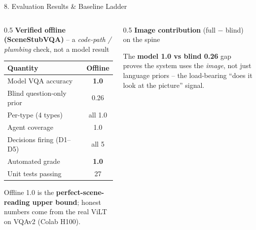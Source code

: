 \documentclass[10pt,aspectratio=169]{beamer}
\begin{document}
\begin{frame}{8. Evaluation Results \& Baseline Ladder}
\begin{columns}[T]
\begin{column}{0.5\textwidth}
\textbf{Verified offline (SceneStubVQA)} -- a \emph{code-path / plumbing} check, not a model result
\begin{table}[h]
\centering\scriptsize
\begin{tabular}{lc}
\toprule
\textbf{Quantity} & \textbf{Offline} \\
\midrule
Model VQA accuracy & \textbf{1.0} \\
Blind question-only prior & 0.26 \\
Per-type (4 types) & all 1.0 \\
Agent coverage & 1.0 \\
Decisions firing (D1--D5) & all 5 \\
Automated grade & \textbf{1.0} \\
Unit tests passing & 27 \\
\bottomrule
\end{tabular}
\end{table}
\scriptsize Offline 1.0 is the \textbf{perfect-scene-reading upper bound}; honest numbers come from the real ViLT on VQAv2 (Colab H100).
\end{column}
\begin{column}{0.5\textwidth}
\textbf{Image contribution} (full $-$ blind) on the spine
\begin{center}
\end{center}
\scriptsize The \textbf{model 1.0 vs blind 0.26} gap proves the system uses the \emph{image}, not just language priors -- the load-bearing ``does it look at the picture'' signal.
\end{column}
\end{columns}
\end{frame}
\end{document}

